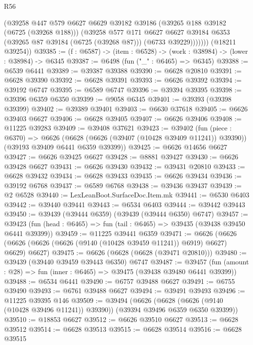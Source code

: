 \begin{lexlean}{R56}
\begin{coremodule}
              (@39258
                @447
                @579
                @6627
                @6629
                @39182
                @39186
                (@39265 @188 @39182 (@6725 (@39268 @188)))
                (@39258
                  @577
                  @171
                  @6627
                  @6627
                  @39184
                  @6353
                  (@39265 @87 @39184 (@6725 (@39268 @87)))
                  (@6733 @39229)))))))
      (@18211 @39254))
@39385 := (f : @6587) -> (item : @6528) -> (work : @38984) -> (lower : @38984) -> @6345
@39387 := @6498 (fun ("_" : @6465) => @6345)
@39388 := @6539 @6441
@39389 := @39387 @39388
@39390 := @6628 @20810
@39391 := @6628 @39390
@39392 := @6628 @39391
@39393 := @6626 @39392
@39394 := @39192 @6747
@39395 := @6589 @6747
@39396 := @39394 @39395
@39398 := @39396 @6359 @6350
@39399 := @9058 @6345
@39401 := @39393 (@39398 @39399)
@39402 := @39389 @39401
@39403 := @6630 @37618
@39405 := @6626 @39403 @6627
@39406 := @6628 @39405
@39407 := @6626 @39406
@39408 := @11225 @39283
@39409 := @39408 @37621
@39423 := @39402
    (fun (piece : @6370) =>
    @6626 (@6628 (@6626 (@39407 (@10428 @39409 @11241)) @39390)) (@39193 @39409 @6441 @6359 @39399))
@39425 := @6626 @14656 @6627
@39427 := @6626 @39425 @6627
@39428 := @8881 @39427
@39430 := @6626 @39428 @6627
@39431 := @6626 @39430
@39432 := @39431 @20810
@39433 := @6628 @39432
@39434 := @6628 @39433
@39435 := @6626 @39434
@39436 := @39192 @6768
@39437 := @6589 @6768
@39438 := @39436 @39437
@39439 := @2 @6528
@39440 := LexLeanBoot.SurfaceDoc.Item.mk
@39441 := @6530 @6403
@39442 := @39440 @39441
@39443 := @6534 @6403
@39444 := @39442 @39443
@39450 := @39439 (@39444 @6359) (@39439 (@39444 @6350) @6747)
@39457 := @39423 (fun (head : @6465) => fun (tail : @6465) => @39435 (@39438 @39450 @6441 @39399))
@39459 := @11225 @39441 @6359
@39471 := @6626
    (@6626 (@6626 (@6626 (@6626 (@9140 (@10428 @39459 @11241)) @6919) @6627) @6629) @6627)
@39475 := @6626 (@6628 (@6628 (@39471 @20810)))
@39480 := @39439 (@39440 @39459 @39443 @6350) @6747
@39487 := @39457 (fun (amount : @28) => fun (inner : @6465) => @39475 (@39438 @39480 @6441 @39399))
@39488 := @6534 @6441
@39490 := @6757 @39488 @6627
@39491 := @6755 @39490
@39493 := @6761 @39488 @6627
@39494 := @39491 @39493
@39496 := @11225 @39395 @146
@39509 := @39494
    (@6626 (@6628 (@6626 (@9140 (@10428 @39496 @11241)) @39390)) (@39394 @39496 @6359 @6350 @39399))
@39510 := @18853 @6627
@39512 := @6626 @39510 @6627
@39513 := @6628 @39512
@39514 := @6628 @39513
@39515 := @6628 @39514
@39516 := @6628 @39515

\end{coremodule}
\end{lexlean}
